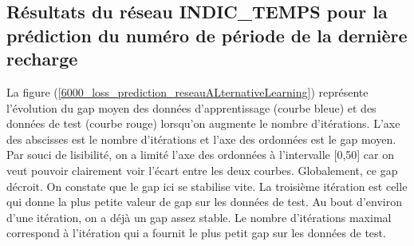 %
%
%


\subsection {Résultats du réseau \textbf{INDIC\_TEMPS} pour la prédiction du numéro de période de la dernière recharge}


La figure (\ref{6000_loss_prediction_reseauALternativeLearning}) représente l'évolution du gap moyen des données d'apprentissage (courbe bleue) et des données de test (courbe rouge) lorsqu'on augmente le nombre d'itérations. L'axe des abscisses est le nombre d'itérations et l'axe des ordonnées est le gap moyen. Par souci de lisibilité, on a limité l'axe des ordonnées à l'intervalle [0,50] car on veut pouvoir clairement voir l'écart entre les deux courbes. Globalement, ce gap décroit. On constate que le gap ici se stabilise vite. La troisième itération est celle qui  donne la plus petite valeur de gap sur les données de test. Au bout d'environ d'une itération, on a déjà un gap assez stable. Le nombre d'itérations maximal correspond à l'itération qui a fournit le plus petit gap sur les données de test.

